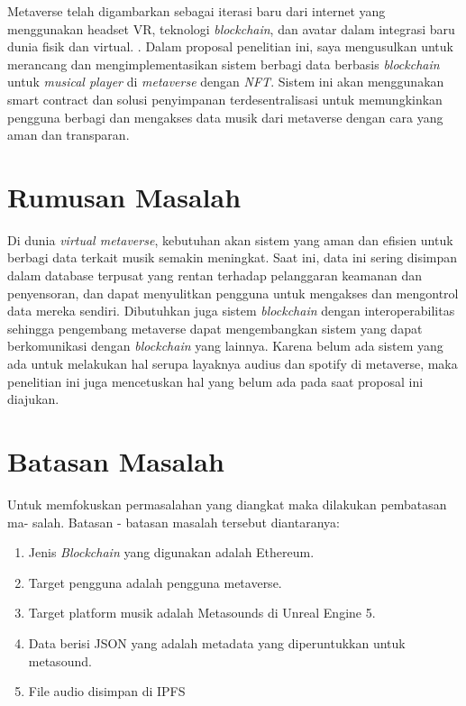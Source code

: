 Metaverse telah digambarkan sebagai iterasi baru dari internet yang menggunakan headset VR, teknologi \emph{blockchain},
dan avatar dalam integrasi baru dunia fisik dan virtual. \parencite{DWIVEDI2022102542}. Dalam proposal penelitian ini, saya mengusulkan
untuk merancang dan mengimplementasikan sistem berbagi data berbasis \emph{blockchain}
untuk \emph{musical player} di \emph{metaverse} dengan \emph{NFT}. Sistem ini akan menggunakan smart contract dan solusi penyimpanan terdesentralisasi
untuk memungkinkan pengguna berbagi dan mengakses data musik dari metaverse dengan cara yang aman dan transparan.

\section{Rumusan Masalah}

Di dunia \emph{virtual metaverse}, kebutuhan akan sistem yang aman dan efisien untuk berbagi data terkait musik semakin meningkat.
Saat ini, data ini sering disimpan dalam database terpusat yang rentan terhadap pelanggaran keamanan dan
penyensoran, dan dapat menyulitkan pengguna untuk mengakses dan mengontrol data mereka sendiri. Dibutuhkan juga sistem \emph{blockchain} dengan interoperabilitas sehingga
pengembang metaverse dapat mengembangkan sistem yang dapat berkomunikasi dengan \emph{blockchain} yang lainnya. Karena belum ada sistem yang ada untuk melakukan hal serupa layaknya audius dan spotify di metaverse,
maka penelitian ini juga mencetuskan hal yang belum ada pada saat proposal ini diajukan.

\section{Batasan Masalah}

Untuk memfokuskan permasalahan yang diangkat maka dilakukan pembatasan ma-
salah. Batasan - batasan masalah tersebut diantaranya:
\begin{enumerate}
  \item Jenis \emph{Blockchain} yang digunakan adalah Ethereum.
  \item Target pengguna adalah pengguna metaverse.
  \item Target platform musik adalah Metasounds di Unreal Engine 5.
  \item Data berisi JSON yang adalah metadata yang diperuntukkan untuk metasound.
  \item File audio disimpan di IPFS
\end{enumerate}

